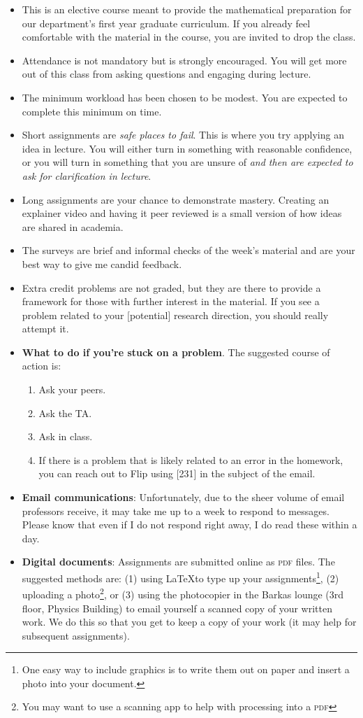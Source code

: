 \documentclass[12pt]{article}
\newcommand{\acro}[1]{\textsc{\MakeLowercase{#1}}}
\numberwithin{equation}{section}    %
\begin{document}
\begin{itemize}
	\item This is an elective course meant to provide the mathematical preparation for our department's first year graduate curriculum. If you already feel comfortable with the material in the course, you are invited to drop the class.
	\item Attendance is not mandatory but is strongly encouraged. You will get more out of this class from asking questions and engaging during lecture.
	\item The minimum workload has been chosen to be modest. You are expected to complete this minimum on time.
	\item Short assignments are \emph{safe places to fail}. This is where you try applying an idea in lecture. You will either turn in something with reasonable confidence, or you will turn in something that you are unsure of \emph{and then are expected to ask for clarification in lecture}. 
	\item Long assignments are your chance to demonstrate mastery. Creating an explainer video and having it peer reviewed is a small version of how ideas are shared in academia. 
	\item The surveys are brief and informal checks of the week's material and are your best way to give me candid feedback.
	\item Extra credit problems are not graded, but they are there to provide a framework for those with further interest in the material. If you see a problem related to your [potential] research direction, you should really attempt it.
	\item 	\textbf{What to do if you're stuck on a problem}. The suggested course of action is:
	\begin{enumerate}
		\item Ask your peers.
		\item Ask the TA.
		\item Ask in class.
		\item If there is a problem that is likely related to an error in the homework, you can reach out to Flip using \textsc{[231]} in the subject of the email.
	\end{enumerate}
	\item \textbf{Email communications}: Unfortunately, due to the sheer volume of email professors receive, it may take me up to a week to respond to messages. Please know that even if I do not respond right away, I do read these within a day.
	\item \textbf{Digital documents}: Assignments are submitted online as \acro{PDF} files. The suggested methods are: (1) using \LaTeX to type up your assignments\footnote{One easy way to include graphics is to write them out on paper and insert a photo into your document.}, (2) uploading a photo\footnote{You may want to use a scanning app to help with processing into a \acro{PDF}}, or (3) using the photocopier in the Barkas lounge (3rd floor, Physics Building) to email yourself a scanned copy of your written work. We do this so that you get to keep a copy of your work (it may help for subsequent assignments).
\end{itemize}
\end{document}
